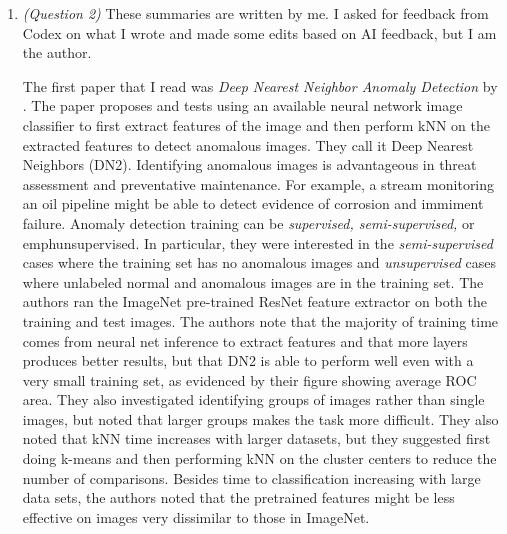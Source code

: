 \documentclass[12pt]{article}
\begin{document}
\begin{enumerate}
Given these results, it would appear that the original unscaled data is the best approach for this particular dataset, but that is not necessarily true in general. I wanted to know which
point was misclassified, so the additional code in the file was created by Codex to help me identify which point label was changed after scaling. 

In general, I would expect scaling to improve accuracy for the KNN algorithm so that no one feature has an outsized influence on the calcuated distance, but if one feature already has low variance, 
it's change from the original data to scaling might mean that after scaling it can influence the classification. Feature 4 from the csv appears to do that in this case. I became curious about whether
we could drop a feature entirely and still perfectly predict the test set. I prompted Codex to check all possible subsets of the features and run the KNN algorithm for the original data and the two different
scaled data. This code showed that if we dropped Feature 4 and used the standardized data, we could stil get 100\% accuracy for $k=1 ... 9$. I think this supports my hypothesis that Feature 4 is the one that is causing the misclassification after scaling.

\item \emph{(Question 2)} 
These summaries are written by me. I asked for feedback from Codex on what I wrote and made some edits based on AI feedback, but I am the author. 

The first paper that I read was \emph{Deep Nearest Neighbor Anomaly Detection} by \cite{bergman2020deep}. The paper proposes and tests using an available neural network image classifier to first extract features of the image and then perform kNN on the extracted features to detect anomalous images. They call it Deep Nearest Neighbors (DN2).
Identifying anomalous images is advantageous in threat assessment and preventative maintenance. For example, a stream monitoring an oil pipeline might be able to detect evidence of corrosion and immiment failure. Anomaly detection training can be \emph{supervised, semi-supervised,} or emph{unsupervised}. In particular,
they were interested in the \emph{semi-supervised} cases where the training set has no anomalous images and \emph{unsupervised} cases where unlabeled normal and anomalous images are in the training set. The authors ran the ImageNet pre-trained ResNet feature extractor on both the training and test images. The authors note that
the majority of training time comes from neural net inference to extract features and that more layers produces better results, but that DN2 is able to perform well even with a very small training set, as evidenced by their figure showing average ROC area. They also investigated identifying groups of images rather than single images, but noted that 
larger groups makes the task more difficult. They also noted that kNN time increases with larger datasets, but they suggested first doing k-means and then performing kNN on the cluster centers to reduce the number of comparisons. Besides time to classification increasing with large data sets, the authors noted that the pretrained features might be less effective on images
very dissimilar to those in ImageNet. 


\end{enumerate}
\end{document}
